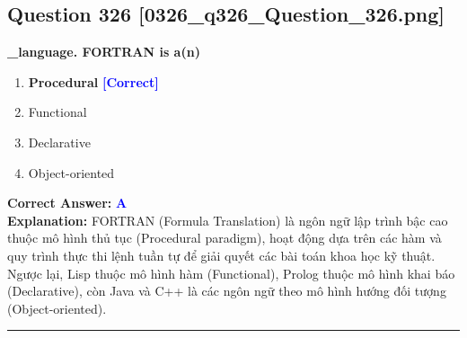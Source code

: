 \documentclass[11pt,a4paper]{article}
\begin{document}
\begin{minipage}{\textwidth}
\subsection*{Question 326 \quad \footnotesize{[0326\_q326\_Question\_326.png]}}
\noindent \textbf{\_language. FORTRAN is a(n)}

\begin{enumerate}[label=\Alph*.]
    \item \textbf{Procedural} \hfill \textcolor{blue}{\textbf{[Correct]}}
    \item Functional
    \item Declarative
    \item Object-oriented
\end{enumerate}

\noindent \textbf{Correct Answer:} \textcolor{blue}{\textbf{A}} \\[2pt]
\noindent \textbf{Explanation:} FORTRAN (Formula Translation) là ngôn ngữ lập trình bậc cao thuộc mô hình thủ tục (Procedural paradigm), hoạt động dựa trên các hàm và quy trình thực thi lệnh tuần tự để giải quyết các bài toán khoa học kỹ thuật. Ngược lại, Lisp thuộc mô hình hàm (Functional), Prolog thuộc mô hình khai báo (Declarative), còn Java và C++ là các ngôn ngữ theo mô hình hướng đối tượng (Object-oriented).

\par\vspace{0.3cm}
\hrule
\vspace{0.3cm}
\end{minipage}
\end{document}
